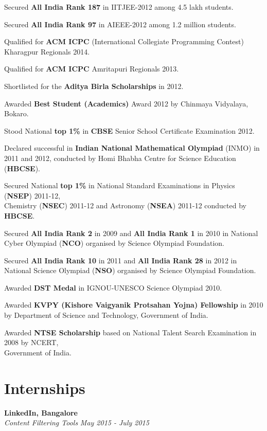 \documentclass[margin,10pt]{resume}
\begin{document}
\begin{resume}
\begin{list2}
\begin{spacing}{1.4}
\item Secured \textbf{All India Rank 187} in IITJEE-2012 among 4.5 lakh students.
\item Secured \textbf{All India Rank 97} in AIEEE-2012 among 1.2 million students.
\item Qualified for \textbf{ACM ICPC} (International Collegiate Programming Contest) \mbox{Kharagpur} Regionals 2014.
\item Qualified for \textbf{ACM ICPC} \mbox{Amritapuri} Regionals 2013.
\item Shortlisted for the \textbf{Aditya Birla Scholarships} in 2012.
\item Awarded \textbf{Best Student (Academics)} Award 2012 by Chinmaya Vidyalaya, Bokaro.
\item Stood National \textbf{top 1\%} in \textbf{CBSE} Senior School Certificate Examination 2012.
\item Declared successful in \textbf{Indian National Mathematical Olympiad} (INMO) in 2011 and 2012, conducted by Homi Bhabha Centre for Science Education (\textbf{HBCSE}).
\item Secured National \textbf{top 1\%} in National Standard Examinations in
Physics (\textbf {NSEP}) \mbox{2011-12,} \\Chemistry (\textbf {NSEC}) 2011-12 and Astronomy (\textbf{NSEA}) 2011-12 conducted by \textbf{HBCSE}.	
\item Secured \textbf{All India Rank 2} in 2009 and \textbf{All India Rank 1} in 2010 in National Cyber Olympiad (\textbf{NCO}) organised by Science Olympiad \mbox{Foundation.}
\item Secured \textbf{All India Rank 10} in 2011 and \textbf{All India Rank 28} in 2012 in National Science Olympiad (\textbf{NSO}) organised by Science Olympiad Foundation.
\item Awarded \textbf{DST Medal} in IGNOU-UNESCO Science Olympiad 2010.
\item Awarded \textbf{KVPY (Kishore Vaigyanik Protsahan Yojna) Fellowship} in 2010
by Department of Science and Technology, Government of India.
\item Awarded \textbf{NTSE Scholarship} based on National Talent Search Examination in 2008 by NCERT,\\ Government of India.
\end{spacing}
\end{list2}
\vspace{-7mm}
\section{\mysidestyle Internships}
\begin{list2}
\item \textbf{LinkedIn, Bangalore}\\
\textsl{Content Filtering Tools} \hfill \emph{May 2015 - July 2015}


\end{list2}
\end{resume}
\end{document}
